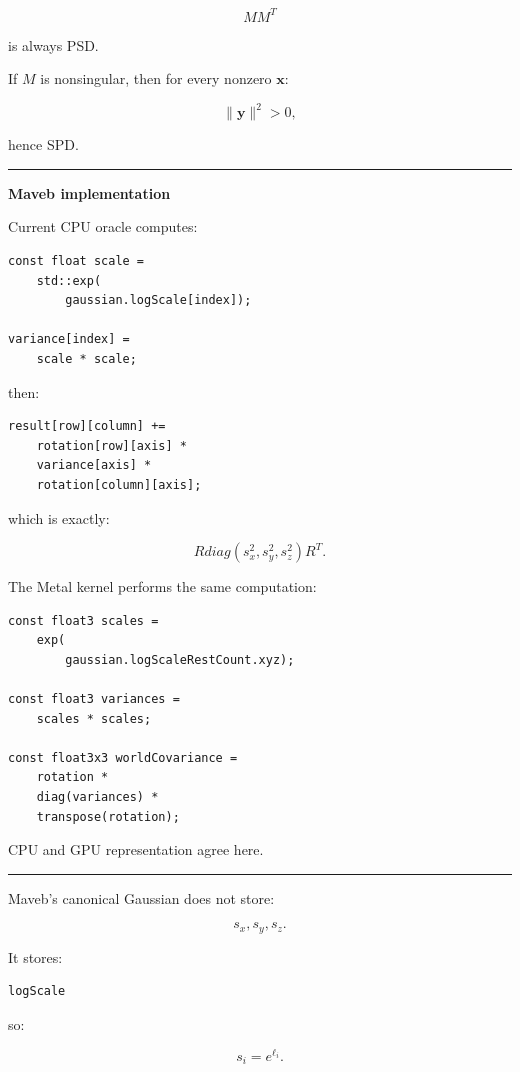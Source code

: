 \[
MM^T
\]

is always PSD.

If \(M\) is nonsingular, then for every nonzero \(\mathbf x\):

\[
\|\mathbf y\|^2>0,
\]

hence SPD.

\begin{center}\rule{0.5\linewidth}{0.5pt}\end{center}

\textbf{Maveb implementation}

Current CPU oracle computes:

\begin{verbatim}
const float scale =
    std::exp(
        gaussian.logScale[index]);

variance[index] =
    scale * scale;
\end{verbatim}

then:

\begin{verbatim}
result[row][column] +=
    rotation[row][axis] *
    variance[axis] *
    rotation[column][axis];
\end{verbatim}

which is exactly:

\[
\boxed{
R
diag(s_x^2,s_y^2,s_z^2)
R^T.
}
\]

The Metal kernel performs the same computation:

\begin{verbatim}
const float3 scales =
    exp(
        gaussian.logScaleRestCount.xyz);

const float3 variances =
    scales * scales;

const float3x3 worldCovariance =
    rotation *
    diag(variances) *
    transpose(rotation);
\end{verbatim}

CPU and GPU representation agree here.

\begin{center}\rule{0.5\linewidth}{0.5pt}\end{center}

Maveb's canonical Gaussian does not store:

\[
s_x,s_y,s_z.
\]

It stores:

\begin{verbatim}
logScale
\end{verbatim}

so:

\[
\boxed{
s_i=e^{\ell_i}.
}
\]

